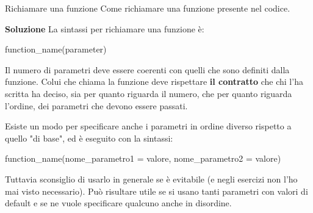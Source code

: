 \documentclass[10pt]{extarticle}
\makeatletter
\newcommand{\<}{\langle}
\renewcommand{\>}{\rangle}
\renewenvironment{proof}[1][\proofname] {\par\pushQED{\qed}
\renewcommand*{\proofname}{Soluzione}
{\normalfont\sffamily\bfseries\topsep6\p@\@plus6\p@\relax #1\@addpunct{.} }}{\popQED\endtrivlist\@endpefalse}
\theoremstyle{mystyle}{\newtheorem*{remark}{Nota}}
\theoremstyle{mystyle}{\newtheorem*{remarks}{Note}}
\theoremstyle{mystyle}{\newtheorem*{example}{Esempio}}
\theoremstyle{mystyle}{\newtheorem*{examples}{Esempi}}
\theoremstyle{definition}{\newtheorem*{exercise}{Exercise}}
\theoremstyle{warn}
\makeatother
\begin{document}
\begin{definition}{Richiamare una funzione}{}
Come richiamare una funzione presente nel codice.
\end{definition}
\begin{proof}
La sintassi per richiamare una funzione è:
\begin{python}
function_name(parameter)
\end{python}
Il numero di parametri deve essere coerenti con quelli che sono definiti dalla funzione. Colui che chiama la funzione deve rispettare \textbf{il contratto} che chi l'ha scritta ha deciso, sia per quanto riguarda il numero, che per quanto riguarda l'ordine, dei parametri che devono essere passati.
\end{proof}
\begin{remark}
Esiste un modo per specificare anche i parametri in ordine diverso rispetto a quello "di base", ed è eseguito con la sintassi:
\begin{python}
function_name(nome_parametro1 = valore, nome_parametro2 = valore)
\end{python}
Tuttavia sconsiglio di usarlo in generale se è evitabile (e negli esercizi     non l'ho mai visto necessario). Può risultare utile se si usano tanti parametri con valori di default e se ne vuole specificare qualcuno anche in disordine.
\end{remark}

\newpage
\end{document}
